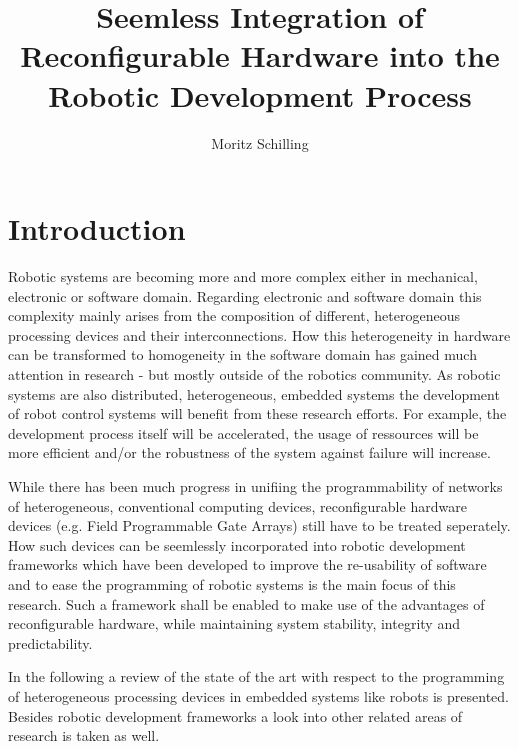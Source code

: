 \documentclass[a4paper,twocolumn]{esapub2005} %
\title{Seemless Integration of Reconfigurable Hardware into the Robotic Development Process}
\author{Moritz Schilling}
\affil{DFKI GmbH, Robert-Hooke-Str. 5, 28359 Bremen, Germany}
\affil{TEC-MMA, ESTEC, 2200 AG Noordwijk, The Netherlands}
\begin{document}
\maketitle




\section{Introduction}

Robotic systems are becoming more and more complex either in mechanical, electronic or software domain.
Regarding electronic and software domain this complexity mainly arises from the composition of different, heterogeneous processing devices and their interconnections.
How this heterogeneity in hardware can be transformed to homogeneity in the software domain has gained much attention in research - but mostly outside of the robotics community.
As robotic systems are also distributed, heterogeneous, embedded systems the development of robot control systems will benefit from these research efforts.
For example, the development process itself will be accelerated, the usage of ressources will be more efficient and/or the robustness of the system against failure will increase.

While there has been much progress in unifiing the programmability of networks of heterogeneous, conventional computing devices,
reconfigurable hardware devices (e.g. Field Programmable Gate Arrays) still have to be treated seperately.
How such devices can be seemlessly incorporated into robotic development frameworks which have been developed to improve the re-usability of software and to ease the programming of robotic systems is the main focus of this research.
Such a framework shall be enabled to make use of the advantages of reconfigurable hardware, while maintaining system stability, integrity and predictability.

In the following a review of the state of the art with respect to the programming of heterogeneous processing devices in embedded systems like robots is presented. Besides robotic development frameworks a look into other related areas of research is taken as well.
\end{document}
